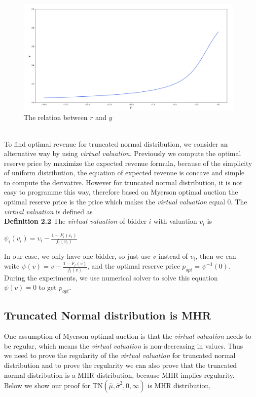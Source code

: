 \begin{figure}
	\centering
	\includegraphics[width=1\textwidth]{tnorm_r}
	\caption{The relation between $r$ and $y$}
	\label{fig:tnorm_r}
\end{figure}\\
To find optimal revenue for truncated normal distribution, we consider an alternative way by using \textit{virtual valuation}. Previously we compute the optimal reserve price by maximize the expected revenue formula, because of the simplicity of uniform distribution, the equation of expected revenue is concave and simple to compute the derivative. However for truncated normal distribution, it is not easy to programme this way, therefore based on Myerson optimal auction the optimal reserve price is the price which makes the \textit{virtual valuation} equal 0. The \textit{virtual valuation} is defined as\\
\textbf{Definition 2.2} The \textit{virtual valuation} of bidder $i$ with valuation $v_i$ is 
\begin{center}
	$\psi_i(v_i) = v_i - \frac{1-F_i(v_i)}{f_i(v_i)}$ 
\end{center}
In our case, we only have one bidder, so just use $v$ instead of $v_i$, then we can write $\psi(v) = v - \frac{1-F_t (v)}{f_t (v)}$, and the optimal reserve price $p_{opt} = \psi^{-1}(0)$. During the experiments, we use numerical solver to solve this equation $\psi(v) = 0$ to get $p_{opt}$.\\

\subsection{Truncated Normal distribution is MHR}
One assumption of Myerson optimal auction is that the \textit{virtual valuation} needs to be regular, which means the \textit{virtual valuation} is non-decreasing in values. Thus we need to prove the regularity of the \textit{virtual valuation} for truncated normal distribution and to prove the regularity we can also prove that the truncated normal distribution is a MHR distribution, because MHR implies regularity. Below we show our proof for TN$(\hat{\mu}, \hat{\sigma}^2, 0, \infty)$ is MHR distribution,


